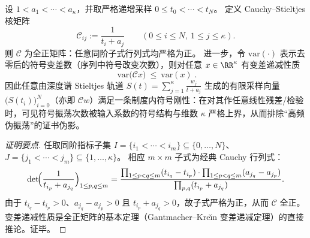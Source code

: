 \begin{proposition}\label{prop:xi-cauchy-stieltjes-total-positivity-variation-diminishing}
设 \(1<a_1<\cdots<a_\kappa\)，并取严格递增采样 \(0\le t_0<\cdots<t_N\)。
定义 Cauchy--Stieltjes 核矩阵
\[
\mathcal{C}_{ij}:=\frac{1}{t_i+a_j}\qquad(0\le i\le N,\ 1\le j\le\kappa).
\]
则 \(\mathcal{C}\) 为全正矩阵：任意同阶子式行列式均严格为正。
进一步，令 \(\mathrm{var}(\cdot)\) 表示去零后的符号变差数（序列中符号改变次数），则对任意 \(x\in\RR^\kappa\) 有变差递减性质
\[
\boxed{\;
\mathrm{var}\!\bigl(\mathcal{C}x\bigr)\ \le\ \mathrm{var}(x)\; }.
\]
因此任意由深度谱 Stieltjes 轨道
\(
S(t)=\sum_{j=1}^\kappa \frac{w_j}{t+a_j}
\)
生成的有限采样向量 \(\bigl(S(t_i)\bigr)_{i=0}^{N}\)（亦即 \(\mathcal{C}w\)）满足一条制度内符号刚性：在对其作任意线性残差/检验时，可见符号振荡次数被输入系数的符号结构与维数 \(\kappa\) 严格上界，从而排除“高频伪振荡”的证书伪影。
\end{proposition}
\begin{proof}[证明要点]
任取同阶指标子集 \(I=\{i_1<\cdots<i_m\}\subseteq\{0,\dots,N\}\)、\(J=\{j_1<\cdots<j_m\}\subseteq\{1,\dots,\kappa\}\)。
相应 \(m\times m\) 子式为经典 Cauchy 行列式：
\[
\det\!\Bigl(\frac{1}{t_{i_p}+a_{j_q}}\Bigr)_{1\le p,q\le m}
=
\frac{\prod_{1\le p<q\le m}(t_{i_q}-t_{i_p})\cdot\prod_{1\le p<q\le m}(a_{j_q}-a_{j_p})}
{\prod_{p,q}(t_{i_p}+a_{j_q})}.
\]
由于 \(t_{i_q}-t_{i_p}>0\)、\(a_{j_q}-a_{j_p}>0\) 且 \(t_{i_p}+a_{j_q}>0\)，故子式严格为正，从而 \(\mathcal{C}\) 全正。
变差递减性质是全正矩阵的基本定理（Gantmacher--Kre\u{\i}n 变差递减定理）的直接推论。证毕。
\end{proof}

\endinput
